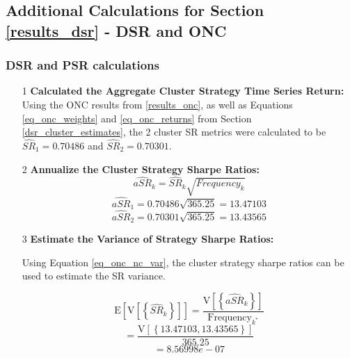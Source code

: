 \documentclass[a4paper,11pt,oneside]{article}
\theoremstyle{plain}
\theoremstyle{definition}
\begin{document}
	
	
	
	
	
	
	
	
	
	
	\subsection{Additional Calculations for Section \ref{results_dsr} - DSR and ONC}\label{results_dsr_appendix}
	
	
	\subsubsection{DSR and PSR calculations}
	
	\begin{itemize}
		\item [1] \textbf{Calculated the Aggregate Cluster Strategy Time Series Return:} \newline
		Using the ONC results from \ref{results_onc}, as well as Equations \ref{eq_onc_weights} and \ref{eq_onc_returns} from Section \ref{dsr_cluster_estimates}, the 2 cluster SR metrics were calculated to be $\widehat{SR}_{1}={0.70486}$ and 	$\widehat{SR}_{2}={0.70301}$. \newline
		
		\item [2] \textbf{Annualize the Cluster Strategy Sharpe Ratios:} \newline
		\begin{equation}
		\widehat{aSR}_{k}=\widehat{SR}_{k}\sqrt{{Frequency_{k}}}
		\end{equation}
		\begin{equation}
		\widehat{aSR}_{1}={0.70486}\sqrt{{365.25}}={13.47103}
		\end{equation}
		\begin{equation}
		\widehat{aSR}_{2}={0.70301}\sqrt{{365.25}} ={13.43565}
		\end{equation}
		
		\item [3] \textbf{Estimate the Variance of Strategy Sharpe Ratios:} \newline
		
		Using Equation \ref{eq_onc_nc_var}, the cluster strategy sharpe ratios can be used to estimate the SR variance. 
		
		\begin{equation}
		\mathrm{E}\left[\mathrm{V}\left[\left\{\widehat{S R}_{k}\right\}\right]\right]=\frac{\mathrm{V}\left[\left\{\widehat{aSR}_{k}\right\}\right]}{\text {Frequency}_{k^{*}}}
		\end{equation}
		\begin{equation}
		=\frac{\mathrm{V}\left[\left\{{13.47103,13.43565} \right\}\right]}{\text {365.25}}
		\end{equation}
		\begin{equation}
		={8.56998e-07}
		\end{equation}
		

\end{itemize}
\end{document}

